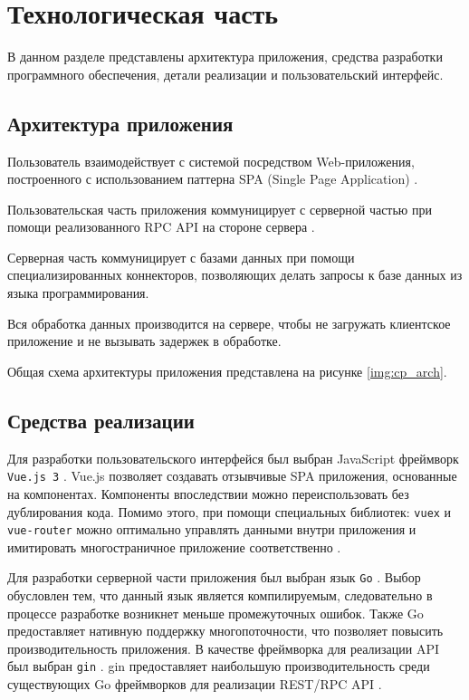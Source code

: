 \chapter{Технологическая часть}

В данном разделе представлены архитектура приложения, средства разработки программного обеспечения, детали реализации и пользовательский интерфейс.

\section{Архитектура приложения}

Пользователь взаимодействует с системой посредством Web-приложения, построенного с использованием паттерна SPA (Single Page Application) \cite{spa}.

Пользовательская часть приложения коммуницирует с серверной частью при помощи реализованного RPC API на стороне сервера \cite{rpc} \cite{API}.

Серверная часть коммуницирует с базами данных при помощи специализированных коннекторов, позволяющих делать запросы к базе данных из языка программирования.

Вся обработка данных производится на сервере, чтобы не загружать клиентское приложение и не вызывать задержек в обработке.

Общая схема архитектуры приложения представлена на рисунке \ref{img:cp_arch}.


\section{Средства реализации}

Для разработки пользовательского интерфейся был выбран JavaScript фреймворк \texttt{Vue.js 3} \cite{js} \cite{vue}. Vue.js позволяет создавать отзывчивые SPA приложения, основанные на компонентах. Компоненты впоследствии можно переиспользовать без дублирования кода. Помимо этого, при помощи специальных библиотек: \texttt{vuex} и \texttt{vue-router} можно оптимально управлять данными внутри приложения и имитировать многостраничное приложение соответственно \cite{vuex} \cite{vuerouter}.

Для разработки серверной части приложения был выбран язык \texttt{Go} \cite{golang}. Выбор обусловлен тем, что данный язык является компилируемым, следовательно в процессе разработке возникнет меньше промежуточных ошибок. Также Go предоставляет нативную поддержку многопоточности, что позволяет повысить производительность приложения. В качестве фреймворка для реализации API был выбран \texttt{gin} \cite{gin}. gin предоставляет наибольшую производительность среди существующих Go фреймворков для реализации REST/RPC API \cite{ginbench}.

